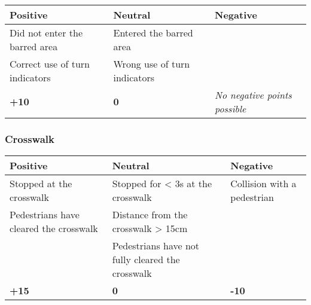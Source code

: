 {	\subsubsection*{}
	\begin{table}[H]
		\begin{tabularx}{\textwidth}{XXX}
			\toprule
			\textbf{Positive}              & \textbf{Neutral}             & \textbf{Negative}                    \\
			\midrule
			Did not enter the barred area  & Entered the barred area      &                                      \\
			Correct use of turn indicators & Wrong use of turn indicators &                                      \\
			\topstrut
			\textbf{+10}                   & \textbf{0}                   & \textit{No negative points possible} \\
			\bottomrule
		\end{tabularx}
	\end{table}

	\subsubsection*{Crosswalk}
	\begin{table}[H]
		\begin{tabularx}{\textwidth}{XXX}
			\toprule
			\textbf{Positive}                         & \textbf{Neutral}                                    & \textbf{Negative}           \\
			\midrule
			Stopped at the crosswalk \footnotemark[1] & Stopped for < 3s at the crosswalk \footnotemark[1]  & Collision with a pedestrian \\
			Pedestrians have cleared the crosswalk    & Distance from the crosswalk > 15cm \footnotemark[1] &                             \\
			                                          & Pedestrians have not fully cleared the crosswalk    &                             \\
			\topstrut
			\textbf{+15}                              & \textbf{0}                                          & \textbf{-10}                \\
			\bottomrule
		\end{tabularx}
	\end{table}

	\newpage

}
